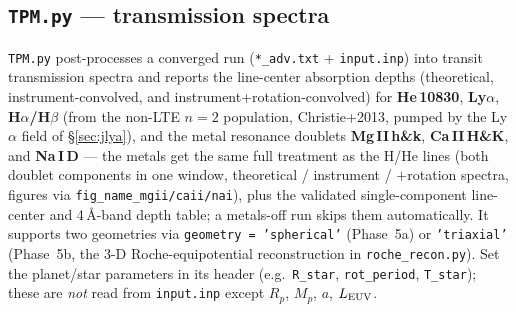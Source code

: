 \documentclass[english,a4paper]{kiseon_memo}
\begin{document}
\subsection{\texttt{TPM.py} --- transmission spectra}\label{sec:tpm}
\texttt{TPM.py} post-processes a converged run (\texttt{*\_adv.txt} +
\texttt{input.inp}) into transit transmission spectra and reports the line-center
absorption depths (theoretical, instrument-convolved, and
instrument+rotation-convolved) for \textbf{He\,10830}, \textbf{Ly$\alpha$},
\textbf{H$\alpha$/H$\beta$} (from the non-LTE $n{=}2$ population, Christie+2013,
pumped by the Ly$\alpha$ field of \S\ref{sec:jlya}),
and the metal resonance doublets \textbf{Mg\,II\,h\&k}, \textbf{Ca\,II\,H\&K},
and \textbf{Na\,I\,D} --- the metals get the same full treatment as the H/He
lines (both doublet components in one window, theoretical / instrument /
$+$rotation spectra, figures via \texttt{fig\_name\_mgii/caii/nai}), plus the
validated single-component line-center and 4\,\AA-band depth table; a
metals-off run skips them automatically. It supports two
geometries via \texttt{geometry = 'spherical'} (Phase~5a) or \texttt{'triaxial'}
(Phase~5b, the 3-D Roche-equipotential reconstruction in \texttt{roche\_recon.py}).
Set the planet/star parameters in its header (e.g.\ \texttt{R\_star},
\texttt{rot\_period}, \texttt{T\_star}); these are \emph{not} read from
\texttt{input.inp} except $R_p$, $M_p$, $a$, $L_{\rm EUV}$.
\end{document}
